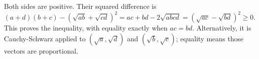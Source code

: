 Both sides are positive. Their squared difference is
\[
(a+d)(b+c)-(\sqrt{ab}+\sqrt{cd})^2
=ac+bd-2\sqrt{abcd}=(\sqrt{ac}-\sqrt{bd})^2\ge0.
\]
This proves the inequality, with equality exactly when $\boxed{ac=bd}$.
Alternatively, it is Cauchy-Schwarz applied to $(\sqrt a,\sqrt d)$ and $(\sqrt b,\sqrt c)$; equality means those vectors are proportional.

